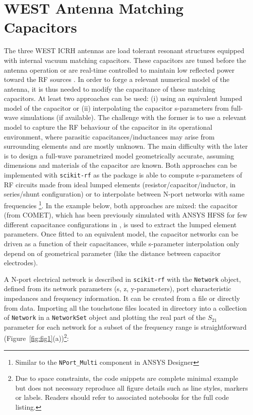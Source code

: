 \documentclass[%
aip,
cp,  %
amsmath,amssymb,%
reprint,%
]{revtex4-2}
\begin{document}
	\section{WEST Antenna Matching Capacitors}
	The three WEST ICRH antennas are load tolerant resonant structures equipped with internal vacuum matching capacitors. These capacitors are tuned before the antenna operation or are real-time controlled to maintain low reflected power toward the RF sources \cite{Hillairet2015}. In order to forge a relevant numerical model of the antenna, it is thus needed to modify the capacitance of these matching capacitors. At least two approaches can be used: (i) using an equivalent lumped model of the capacitor or (ii) interpolating the capacitor s-parameters from full-wave simulations (if available). The challenge with the former is to use a relevant model to capture the RF behaviour of the capacitor in its operational environment, where parasitic capacitances/inductances may arise from surrounding elements and are mostly unknown. The main difficulty with the later is to design a full-wave parametrized model geometrically accurate, assuming dimensions and materials of the capacitor are known. Both approaches can be implemented with \texttt{scikit-rf} as the package is able to compute s-parameters of RF circuits made from ideal lumped elements (resistor/capacitor/inductor, in series/shunt configuration)  or to interpolate between N-port networks with same frequencies \footnote{Similar to the \texttt{NPort\_Multi} component in ANSYS Designer}. In the example below, both approaches are mixed: the capacitor (from COMET), which has been previously simulated with ANSYS HFSS for few different capacitance configurations in \cite{Helou2018_PhD}, is used to extract the lumped element parameters. Once fitted to an equivalent model, the capacitor networks can be driven as a function of their capacitances, while s-parameter interpolation only depend on of geometrical parameter (like the distance between capacitor electrodes).
	
	A N-port electrical network is described in \texttt{scikit-rf} with the \texttt{Network} object, defined from its network parameters (s, z, y-parameters),
	port characteristic impedances and frequency information. It can be created from a file or directly from data. Importing all the touchstone files located in directory into a collection of \texttt{Network} in a \texttt{NetworkSet} object and plotting the real part of the $S_{21}$ parameter for each network for a subset of the frequency range is straightforward (Figure~\ref{fig:fig1}(a))\footnote{Due to space constraints, the code snippets are complete minimal example but does not necessary reproduce all figure details such as line styles, markers or labels. Readers should refer to associated notebooks for the full code listing.}:
	
\end{document}

